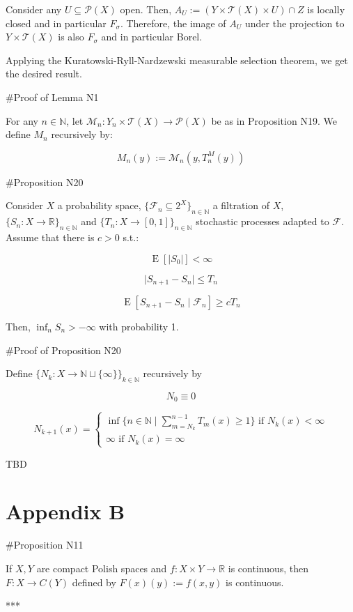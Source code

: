 \documentclass[a4paper]{article}
\DeclareMathOperator{\E}{E}
\newcommand{\Nats}{\mathbb{N}}
\newcommand{\Reals}{\mathbb{R}}
\newcommand{\Abs}[1]{\lvert #1 \rvert}
\newcommand{\Prob}{\mathcal{P}}
\newcommand{\T}{\mathcal{T}}
\newcommand{\F}{\mathcal{F}}
\begin{document}
Consider any ${U \subseteq \Prob(X)}$ open. Then, ${A_U:=(Y \times \T(X) \times U) \cap Z}$ is locally closed and in particular ${F_\sigma}$. Therefore, the image of ${A_U}$ under the projection to ${Y \times \T(X)}$ is also ${F_\sigma}$ and in particular Borel. 

Applying the Kuratowski-Ryll-Nardzewski measurable selection theorem, we get the desired result.

\#Proof of Lemma N1

For any ${n \in \Nats}$, let ${\mathcal{M}_n: Y_n \times \T(X) \rightarrow \Prob(X)}$ be as in Proposition N19. We define ${M_n}$ recursively by:

$$M_n(y):=\mathcal{M}_n(y,T_n^M(y))$$

\#Proposition N20

Consider ${X}$ a probability space, ${\{\F_n \subseteq 2^X\}_{n \in \Nats}}$ a filtration of ${X}$, ${\{S_n:X \rightarrow \Reals\}_{n \in \Nats}}$ and ${\{T_n:X \rightarrow [0,1]\}_{n \in \Nats}}$ stochastic processes adapted to ${\F}$. Assume that there is ${c > 0}$ s.t.:

$$\E[\Abs{S_0}] < \infty$$

$$\Abs{S_{n+1}-S_n} \leq T_n$$

$$\E[S_{n+1} - S_n \mid \F_n] \geq c T_n$$

Then, ${\inf_{n} S_n > -\infty}$ with probability 1.

\#Proof of Proposition N20

Define ${\{N_k: X \rightarrow \Nats \sqcup \{\infty\}\}_{k \in \Nats}}$ recursively by

$$N_0 \equiv 0$$

$$N_{k+1}(x) = \begin{cases}\inf \{n \in \Nats \mid \sum_{m=N_k}^{n-1} T_m(x) \geq 1\} \text{ if } N_k(x) < \infty\\\infty \text{ if } N_k(x) = \infty\end{cases}$$

TBD

\section{Appendix B}

\#Proposition N11

If ${X,Y}$ are compact Polish spaces and ${f: X \times Y \rightarrow \Reals}$ is continuous, then ${F: X \rightarrow C(Y)}$ defined by ${F(x)(y):=f(x,y)}$ is continuous.

***
\end{document}
